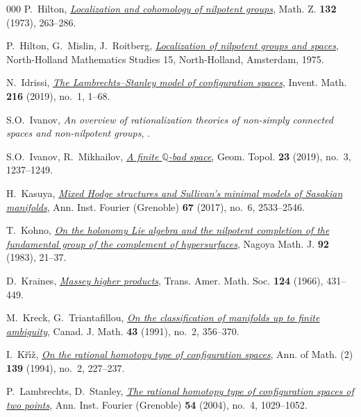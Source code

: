 \documentclass{article}
\numberwithin{equation}{section}
\theoremstyle{definition}
\newcommand{\Q}{\mathbb{Q}}
\begin{document}
\begin{thebibliography}{000}
 P.~Hilton, 
\href{https://dx.doi.org/10.1007/BF01179733}%
{\em Localization and cohomology of nilpotent groups}, 
Math. Z. \textbf{132} (1973), 263--286.

  P.~Hilton, G.~Mislin, J.~Roitberg, 
\href{https://www.sciencedirect.com/bookseries/north-holland-mathematics-studies/vol/15/}%
{\em Localization of nilpotent groups and spaces},
North-Holland Mathematics Studies 15, 
North-Holland, Amsterdam, 1975.

 N.~Idrissi, 
\href{https://dx.doi.org/10.1007/s00222-018-0842-9}%
{\em The Lambrechts--Stanley model of configuration spaces}, 
Invent. Math. \textbf{216} (2019), no.~1, 1--68. 

 S.O.~Ivanov,
{\em An overview of rationalization theories of non-simply 
connected spaces and non-nilpotent groups}, 
.

 S.O.~Ivanov, R.~Mikhailov, 
\href{https://dx.doi.org/10.2140/gt.2019.23.1237}%
{\em A finite $\Q$-bad space}, Geom. Topol. \textbf{23} (2019), 
no.~3, 1237--1249. 

 H.~Kasuya,  
\href{https://doi.org/10.5802/aif.3142}%
{\em Mixed Hodge structures and Sullivan's minimal models of 
Sasakian manifolds}, Ann. Inst. Fourier (Grenoble) \textbf{67} 
(2017), no.~6, 2533--2546. 

 T.~Kohno, 
\href{http://projecteuclid.org/euclid.nmj/1118787354}%
{\em On the holonomy {L}ie algebra and the nilpotent completion of the
 fundamental group of the complement of hypersurfaces}, 
 Nagoya Math. J. \textbf{92} (1983), 21--37. 
 
 D.~Kraines, 
\href{https://doi.org/10.2307/1994385}%
{\em Massey higher products}, 
Trans. Amer. Math. Soc. \textbf{124} (1966), 431--449. 

 M.~Kreck, G.~Triantafillou, 
\href{https://doi.org/10.4153/CJM-1991-021-4}%
{\em On the classification of manifolds up to finite ambiguity}, 
Canad. J. Math. \textbf{43} (1991), no.~2, 356--370. 

 I.~K\v{r}\'{\i}\v{z},
\href{https://doi.org/10.2307/2946581}%
{\em On the rational homotopy type of configuration spaces}, 
Ann. of Math. (2) \textbf{139} (1994), no.~2, 227--237. 

  P.~Lambrechts, D.~Stanley,
\href{https://doi.org/10.5802/aif.2042}%
{\em The rational homotopy type of configuration spaces of two points}, 
Ann. Inst. Fourier (Grenoble) \textbf{54} (2004), no.~4, 1029--1052. 


\end{thebibliography}
\end{document}
